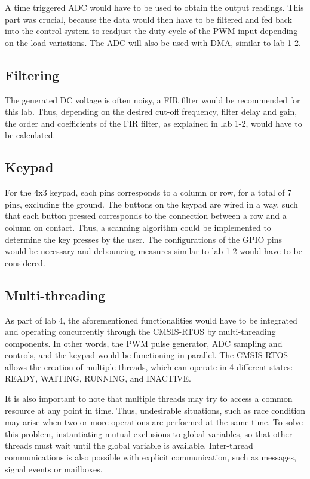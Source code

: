 \documentclass[a4paper,titlepage]{article}
\begin{document}
A time triggered ADC would have to be used to obtain the output readings. This part was crucial, because the data would then have to be filtered and fed back into the control system to readjust the duty cycle of the PWM input depending on the load variations. The ADC will also be used with DMA, similar to lab 1-2.
\subsection{Filtering}
The generated DC voltage is often noisy, a FIR filter would be recommended for this lab. Thus, depending on the desired cut-off frequency, filter delay and gain, the order and coefficients of the FIR filter, as explained in lab 1-2, would have to be calculated.
\subsection{Keypad}
For the 4x3 keypad, each pins corresponds to a column or row, for a total of 7 pins, excluding the ground. The buttons on the keypad are wired in a way, such that each button pressed corresponds to the connection between a row and a column on contact. Thus, a scanning algorithm could be implemented to determine the key presses by the user. The configurations of the GPIO pins would be necessary and debouncing measures similar to lab 1-2 would have to be considered.

\subsection{Multi-threading}
As part of lab 4, the aforementioned functionalities would have to be integrated and operating concurrently through the CMSIS-RTOS  by multi-threading components. In other words, the PWM pulse generator, ADC sampling and controls, and the keypad would be functioning in parallel.
The CMSIS RTOS allows the creation of multiple threads, which can operate in 4 different states: READY, WAITING, RUNNING, and INACTIVE.

It is also important to note that multiple threads may try to access a common resource at any point in time. Thus, undesirable situations, such as race condition may arise when two or more operations are performed at the same time. To solve this problem, instantiating mutual exclusions to global variables, so that other threads must wait until the global variable is available. Inter-thread communications is also possible with explicit communication, such as messages, signal events or mailboxes.
\end{document}
